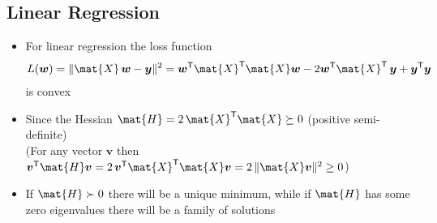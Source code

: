 
\begin{slide}
\section{Linear Regression}

\begin{PauseHighLight}
  \begin{itemize}
  \item For linear regression the loss function
    \begin{align*}
      L(\bm{w}) = \| \mat{X}\, \bm{w} - \bm{y} \|^2 = \bm{w}^\tr
      \mat{X}^\tr\mat{X} \bm{w} - 2 \bm{w}^\tr \mat{X}^\tr\, \bm{y} +
      \bm{y}^\tr \bm{y}
    \end{align*}
    is convex\pause
  \item Since the Hessian $\mat{H} = 2\,\mat{X}^\tr \mat{X} \succeq 0$
    (positive semi-definite)\pause\\
    (For any vector $\bm{v}$ then $\bm{v}^\tr \mat{H} \bm{v} =
    2\,\bm{v}^\tr\mat{X}^\tr \mat{X}\bm{v} = 2\,\| \mat{X}\bm{v} \|^2 \geq 0$)\pauseb
  \item If $\mat{H}\succ 0$ there will be a unique minimum\pause, while
    if $\mat{H}$ has some zero eigenvalues there will be a family of
    solutions\pauseb
  \end{itemize}
\end{PauseHighLight}

\end{slide}


